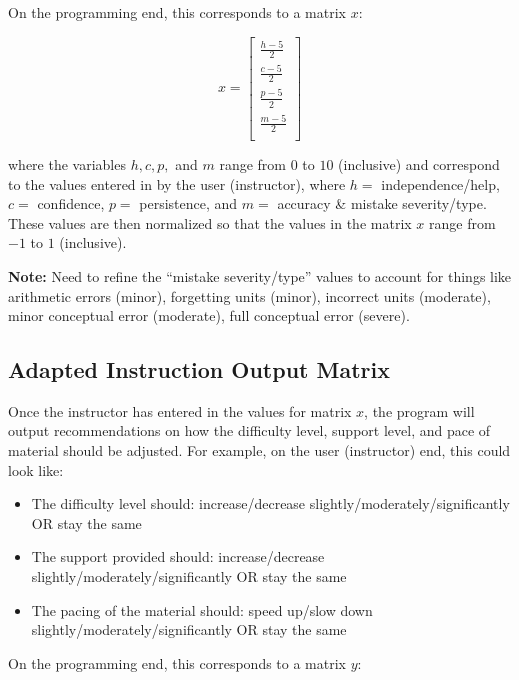 \documentclass{article}
\begin{document}
        On the programming end, this corresponds to a matrix $x$:

        \[
            x = \begin{bmatrix}
                \frac{h-5}{2} \\
                \frac{c-5}{2} \\
                \frac{p-5}{2} \\
                \frac{m-5}{2} \\
            \end{bmatrix}
        \]

        where the variables $h, c, p,$ and $m$ range from $0$ to $10$ (inclusive) and correspond to the values entered in by the user (instructor), where $h = $ independence/help, $c = $ confidence, $p = $ persistence, and $m = $ accuracy \& mistake severity/type. These values are then normalized so that the values in the matrix $x$ range from $-1$ to $1$ (inclusive).

        \textbf{Note:} Need to refine the ``mistake severity/type'' values to account for things like arithmetic errors (minor), forgetting units (minor), incorrect units (moderate), minor conceptual error (moderate), full conceptual error (severe).

    \subsection{Adapted Instruction Output Matrix}

        Once the instructor has entered in the values for matrix $x$, the program will output recommendations on how the difficulty level, support level, and pace of material should be adjusted. For example, on the user (instructor) end, this could look like:

        \begin{itemize}
            \item The difficulty level should: increase/decrease slightly/moderately/significantly OR stay the same
            \item The support provided should: increase/decrease slightly/moderately/significantly OR stay the same
            \item The pacing of the material should: speed up/slow down slightly/moderately/significantly OR stay the same
        \end{itemize}

        On the programming end, this corresponds to a matrix $y$:
\end{document}
